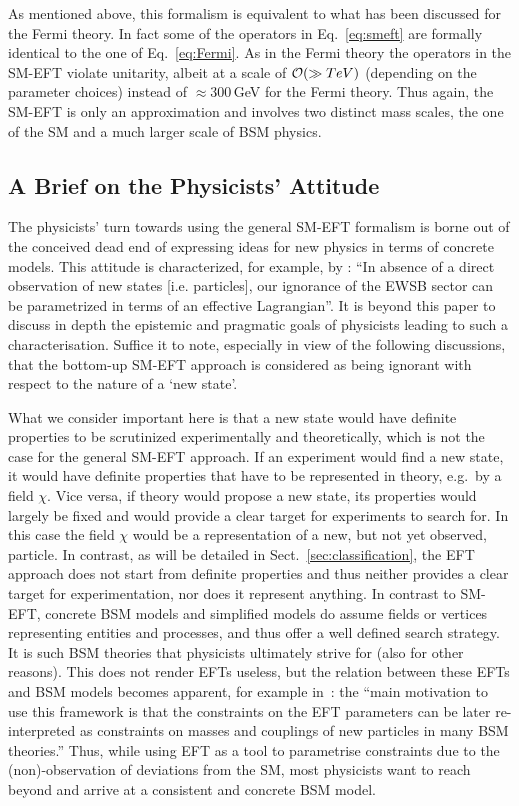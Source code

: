 As mentioned above, this formalism is equivalent to what has been discussed for the Fermi theory. 
In fact some of the operators in Eq.~\ref{eq:smeft} are formally identical to the one of Eq.~\ref{eq:Fermi}. 
As in the Fermi theory the operators in the SM-EFT violate
unitarity, albeit at a scale of ${\cal O}(\gg TeV)$ (depending on the
parameter choices) instead of $\approx
300$\,GeV for the Fermi theory. Thus again, the SM-EFT is only an approximation and
involves two distinct mass scales, the one of the SM and a much larger scale of BSM physics.


\subsection{A Brief on the Physicists' Attitude}
\label{sec:physrepres}

The physicists' turn towards using the general SM-EFT formalism is borne out of the conceived dead end of expressing ideas for new physics in terms of concrete models.
This attitude is characterized, for example, by \cite[p.~1]{Contino:2013kra}:
``In absence of a direct observation of new states [i.e.{} particles], our ignorance of the EWSB sector can be parametrized 
in terms of an effective Lagrangian''.
It is beyond this paper to discuss in depth the epistemic and pragmatic goals of physicists leading to such a characterisation.
Suffice it to note, especially in view of the following discussions, that the bottom-up SM-EFT approach is considered as being ignorant with respect to the nature of a `new state'.

What we consider important here is that a new state would have
definite properties to be scrutinized experimentally and theoretically, which is not the case for the 
general SM-EFT approach.
If an experiment would find a new state, it would have definite properties that have to be represented in theory, e.g.\ by a field $\chi $.
Vice versa, if theory would propose a new state, its properties would largely be fixed and
would provide a clear target for experiments to search for.
In this case the field $\chi $ would be a representation of a new, but
not yet observed, particle.
In contrast, as will be detailed in Sect.~\ref{sec:classification}, the EFT approach
does not start from definite properties and thus neither provides
a clear target for experimentation, nor does it represent anything.  
In contrast to SM-EFT, concrete BSM models and simplified models
do assume fields or vertices representing entities and processes, and thus offer a well defined search strategy. 
It is such BSM theories that physicists ultimately strive for (also for other reasons).
This does not render EFTs useless, but the relation between these EFTs and BSM models becomes
apparent, for example in~\cite[p.~305]{deFlorian:2016spz}: the
``main motivation to use this framework is that the constraints on the EFT parameters can be 
later re-interpreted as constraints on masses and couplings of new particles in many BSM theories.''
Thus, while using EFT as a tool to parametrise constraints due to the (non)-observation of deviations
from the SM, most physicists want to reach beyond and arrive at a consistent and concrete BSM model.
